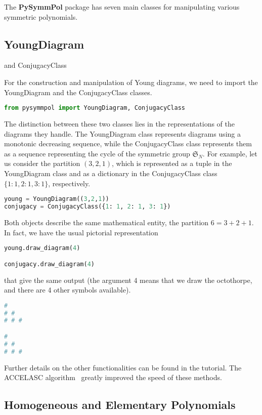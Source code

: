 \documentclass[a4paper,10pt]{amsart}
\begin{document}
The \textbf{PySymmPol} package has seven main classes for manipulating
various symmetric polynomials.

\subsection{YoungDiagram} and ConjugacyClass

For the construction and manipulation of Young diagrams, we need to import 
the YoungDiagram and the ConjugacyClass classes. 
\begin{lstlisting}[language=Python]
from pysymmpol import YoungDiagram, ConjugacyClass
\end{lstlisting}

The distinction between these two classes lies in the representations of the diagrams 
they handle. The YoungDiagram class represents diagrams using a monotonic decreasing sequence, 
while the ConjugacyClass class represents them as a sequence representing the cycle 
of the symmetric group $\mathfrak{S}_N$. For example, let us consider the partition
$(3,2,1)$, which is represented as a tuple in the YoungDiagram class and 
as a dictionary in the ConjugacyClass class $\{1: 1, 2: 1, 3: 1\}$, respectively.
\begin{lstlisting}[language=Python]
young = YoungDiagram((3,2,1))
conjugacy = ConjugacyClass({1: 1, 2: 1, 3: 1})
\end{lstlisting}
Both objects describe the same mathematical entity, the partition \(6=3+2+1\).
In fact, 
we have the usual pictorial representation 
\begin{lstlisting}[language=Python]
young.draw_diagram(4)

conjugacy.draw_diagram(4)
\end{lstlisting}
that give the same output (the argument 4 means that we draw the octothorpe, and
there are 4 other symbols available).
\begin{lstlisting}[language=Python]
#
# #
# # #

#
# #
# # #
\end{lstlisting}
Further details on the other functionalities can be found in the tutorial.
The \textrm{ACCELASC} algorithm~\cite{Kelleher:2009} greatly improved the
speed of these methods.

\subsection{Homogeneous and Elementary Polynomials}
\end{document}
